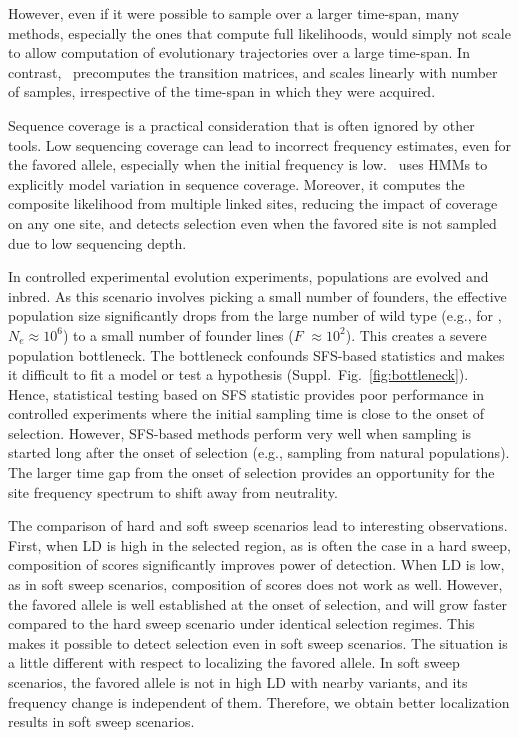 However, even if it were possible to sample over a larger time-span,
many methods, especially the ones that compute full likelihoods, would
simply not scale to allow computation of evolutionary trajectories
over a large time-span. In contrast, \comale\ precomputes the
transition matrices, and scales linearly with number of samples,
irrespective of the time-span in which they were acquired.

Sequence coverage is a practical consideration that is often ignored
by other tools. Low sequencing coverage can lead to incorrect
frequency estimates, even for the favored allele, especially when the
initial frequency is low. \comale\ uses HMMs to explicitly model
variation in sequence coverage. Moreover, it computes the composite
likelihood from multiple linked sites, reducing the impact of coverage
on any one site, and detects selection even when the favored site is
not sampled due to low sequencing depth.


In controlled experimental evolution experiments, populations are
evolved and inbred. As this scenario involves picking a small number
of founders, the effective population size significantly drops from
the large number of wild type (e.g., for \dmel, $N_e\approx10^6$) to a
small number of founder lines ($F$ $\approx 10^2$). This creates a severe 
population
bottleneck. The bottleneck confounds SFS-based statistics and makes
it difficult to fit a model or test a hypothesis
(Suppl.~Fig.~\ref{fig:bottleneck}).  Hence, statistical testing based
on SFS statistic provides poor performance in controlled experiments
where the initial sampling time is close to the onset of selection.
However, SFS-based methods perform very well when sampling is started
long after the onset of selection (e.g., sampling from natural
populations). The larger time gap from the onset of selection provides
an opportunity for the site frequency spectrum to shift away from
neutrality.



The comparison of hard and soft sweep scenarios lead to interesting
observations. First, when LD is high in the selected region, as is
often the case in a hard sweep, composition of scores significantly
improves power of detection. When LD is low, as in soft sweep
scenarios, composition of scores does not work as well. However, the
favored allele is well established at the onset of selection, and will
grow faster compared to the hard sweep scenario under identical
selection regimes. This makes it possible to detect selection even in
soft sweep scenarios. The situation is a little different with respect
to localizing the favored allele. In soft sweep scenarios, the favored
allele is not in high LD with nearby variants, and its frequency
change is independent of them. Therefore, we obtain better
localization results in soft sweep scenarios.

